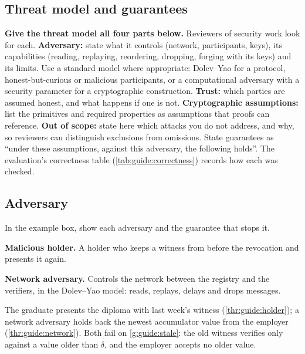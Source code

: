 \subsection{Threat model and guarantees}\label{app:chapters:threat-model}
\textbf{Give the threat model all four parts below.} Reviewers of security work look for each.
\textbf{Adversary:} state what it controls (network, participants, keys), its capabilities (reading, replaying, reordering, dropping, forging with its keys) and its limits. Use a standard model where appropriate: Dolev--Yao for a protocol, honest-but-curious or malicious participants, or a computational adversary with a security parameter for a cryptographic construction.
\textbf{Trust:} which parties are assumed honest, and what happens if one is not.
\textbf{Cryptographic assumptions:} list the primitives and required properties as assumptions that proofs can reference.
\textbf{Out of scope:} state here which attacks you do not address, and why, so reviewers can distinguish exclusions from omissions.
State guarantees as \enquote{under these assumptions, against this adversary, the following holds}. The evaluation's correctness table (\cref{tab:guide:correctness}) records how each was checked.

\subsection[Adversary]{Adversary\skimmark}\label{app:chapters:adversary}
In the example box, show each adversary and the guarantee that stops it.
\begin{threats}
  \item\label{thr:guide:holder} \textbf{Malicious holder.} A holder who keeps a witness from before the revocation and presents it again.
  \item\label{thr:guide:network} \textbf{Network adversary.} Controls the network between the registry and the verifiers, in the Dolev--Yao model: reads, replays, delays and drops messages.
\end{threats}
\begin{runningexample}
The graduate presents the diploma with last week's witness (\cref{thr:guide:holder}); a network adversary holds back the newest accumulator value from the employer (\cref{thr:guide:network}). Both fail on \cref{g:guide:stale}: the old witness verifies only against a value older than $\delta$, and the employer accepts no older value.
\end{runningexample}

